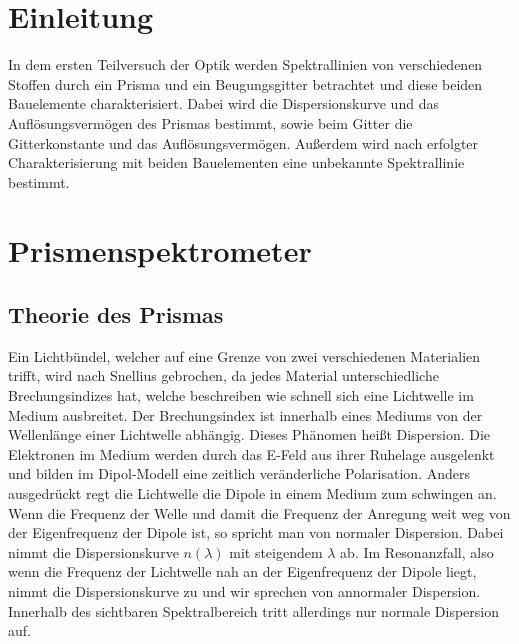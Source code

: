 \documentclass[a4paper, 11pt]{article}
\begin{document}
\newpage
\thispagestyle{empty}
\tableofcontents
\newpage

\pagestyle{fancy}
\fancyhf{}
\fancyhead[L]{\nouppercase{\leftmark}}
\fancyhead[R]{\thepage}
\renewcommand{\headrulewidth}{0.5pt}
\fancyfoot[C]{\thepage}


\setcounter{page}{1}

\section{Einleitung}
In dem ersten Teilversuch der Optik werden Spektrallinien von verschiedenen Stoffen durch ein Prisma und ein Beugungsgitter betrachtet und diese beiden Bauelemente charakterisiert.
Dabei wird die Dispersionskurve und das Auflösungsvermögen des Prismas bestimmt, sowie beim Gitter die Gitterkonstante und das Auflösungsvermögen.
Außerdem wird nach erfolgter Charakterisierung mit beiden Bauelementen eine unbekannte Spektrallinie bestimmt.

\section{Prismenspektrometer}
\subsection{Theorie des Prismas}
Ein Lichtbündel, welcher auf eine Grenze von zwei verschiedenen Materialien trifft, wird nach Snellius gebrochen, da jedes Material unterschiedliche Brechungsindizes hat, welche beschreiben wie schnell sich eine Lichtwelle im Medium ausbreitet. Der Brechungsindex ist innerhalb eines Mediums von der Wellenlänge einer Lichtwelle abhängig. Dieses Phänomen heißt Dispersion. 
Die Elektronen im Medium werden durch das E-Feld aus ihrer Ruhelage ausgelenkt und bilden im Dipol-Modell eine zeitlich veränderliche Polarisation. Anders ausgedrückt regt die Lichtwelle die Dipole in einem Medium zum schwingen an. Wenn die Frequenz der Welle und damit die Frequenz der Anregung weit weg von der Eigenfrequenz der Dipole ist, so spricht man von normaler Dispersion. Dabei nimmt die Dispersionskurve $n(\lambda )$ mit steigendem $\lambda $ ab. Im Resonanzfall, also wenn die Frequenz der Lichtwelle nah an der Eigenfrequenz der Dipole liegt, nimmt die Dispersionskurve zu und wir sprechen von annormaler Dispersion. Innerhalb des sichtbaren Spektralbereich tritt allerdings nur normale Dispersion auf.
\end{document}
